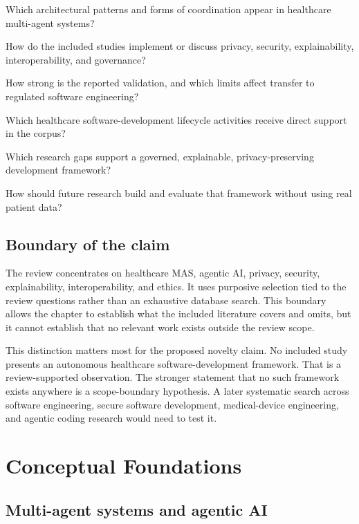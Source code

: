 \documentclass[11pt,a4paper]{article}
\begin{document}
\begin{description}[leftmargin=3.6em,style=nextline]
  \item[RQ1] Which architectural patterns and forms of coordination appear in healthcare multi-agent systems?
  \item[RQ2] How do the included studies implement or discuss privacy, security, explainability, interoperability, and governance?
  \item[RQ3] How strong is the reported validation, and which limits affect transfer to regulated software engineering?
  \item[RQ4] Which healthcare software-development lifecycle activities receive direct support in the corpus?
  \item[RQ5] Which research gaps support a governed, explainable, privacy-preserving development framework?
  \item[RQ6] How should future research build and evaluate that framework without using real patient data?
\end{description}

\subsection{Boundary of the claim}

The review concentrates on healthcare MAS, agentic AI, privacy, security, explainability, interoperability, and ethics. It uses purposive selection tied to the review questions rather than an exhaustive database search. This boundary allows the chapter to establish what the included literature covers and omits, but it cannot establish that no relevant work exists outside the review scope.

This distinction matters most for the proposed novelty claim. No included study presents an autonomous healthcare software-development framework. That is a review-supported observation. The stronger statement that no such framework exists anywhere is a scope-boundary hypothesis. A later systematic search across software engineering, secure software development, medical-device engineering, and agentic coding research would need to test it.

\section{Conceptual Foundations}

\subsection{Multi-agent systems and agentic AI}
\end{document}
